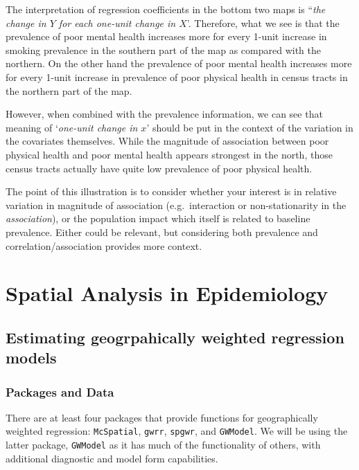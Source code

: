 \documentclass[
]{book}
\begin{document}
The interpretation of regression coefficients in the bottom two maps is ``\emph{the change in \(Y\) for each one-unit change in \(X\)}'. Therefore, what we see is that the prevalence of poor mental health increases more for every 1-unit increase in smoking prevalence in the southern part of the map as compared with the northern. On the other hand the prevalence of poor mental health increases more for every 1-unit increase in prevalence of poor physical health in census tracts in the northern part of the map.

However, when combined with the prevalence information, we can see that meaning of `\emph{one-unit change in \(x\)}' should be put in the context of the variation in the covariates themselves. While the magnitude of association between poor physical health and poor mental health appears strongest in the north, those census tracts actually have quite low prevalence of poor physical health.

The point of this illustration is to consider whether your interest is in relative variation in magnitude of association (e.g.~interaction or non-stationarity in the \emph{association}), or the population impact which itself is related to baseline prevalence. Either could be relevant, but considering both prevalence and correlation/association provides more context.

\hypertarget{spatial-analysis-in-epidemiology-7}{%
\section{Spatial Analysis in Epidemiology}\label{spatial-analysis-in-epidemiology-7}}

\hypertarget{estimating-geogrpahically-weighted-regression-models}{%
\subsection{Estimating geogrpahically weighted regression models}\label{estimating-geogrpahically-weighted-regression-models}}

\hypertarget{packages-and-data-1}{%
\subsubsection{Packages and Data}\label{packages-and-data-1}}

There are at least four packages that provide functions for geographically weighted regression: \texttt{McSpatial}, \texttt{gwrr}, \texttt{spgwr}, and \texttt{GWModel}. We will be using the latter package, \texttt{GWModel} as it has much of the functionality of others, with additional diagnostic and model form capabilities.
\end{document}
